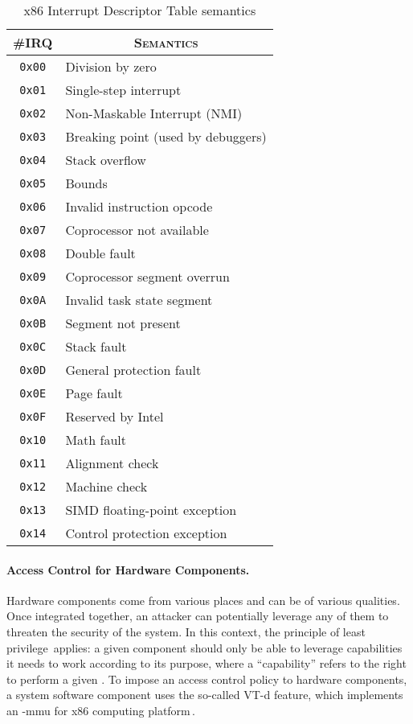\begin{table}
  \centering
  \begin{tabular}{cl}
    {\scshape \#IRQ}
    & \multicolumn{1}{c}{\scshape Semantics} \\
    \hline
    \texttt{0x00}
    & Division by zero \\
    \texttt{0x01}
    & Single-step interrupt \\
    \texttt{0x02}
    & Non-Maskable Interrupt (NMI) \\
    \texttt{0x03}
    & Breaking point (used by debuggers) \\
    \texttt{0x04}
    & Stack overflow \\
    \texttt{0x05}
    & Bounds \\
    \texttt{0x06}
    & Invalid instruction opcode \\
    \texttt{0x07}
    & Coprocessor not available \\
    \texttt{0x08}
    & Double fault \\
    \texttt{0x09}
    & Coprocessor segment overrun \\
    \texttt{0x0A}
    & Invalid task state segment \\
    \texttt{0x0B}
    & Segment not present \\
    \texttt{0x0C}
    & Stack fault \\
    \texttt{0x0D}
    & General protection fault \\
    \texttt{0x0E}
    & Page fault \\
    \texttt{0x0F}
    & Reserved by Intel \\
    \texttt{0x10}
    & Math fault \\
    \texttt{0x11}
    & Alignment check \\
    \texttt{0x12}
    & Machine check \\
    \texttt{0x13}
    & SIMD floating-point exception \\
    \texttt{0x14}
    & Control protection exception \\
  \end{tabular}
  \caption{x86 Interrupt Descriptor Table semantics}
  \label{tab:usecase:idt}
\end{table}

\paragraph{Access Control for Hardware Components.}
%
Hardware components come from various places and can be of various qualities.
%
Once integrated together, an attacker can potentially leverage any of them to
threaten the security of the system.
%
In this context, the principle of least
privilege\,\cite{saltzer1975leastprivilege} applies: a given component should
only be able to leverage capabilities it needs to work according to its purpose,
where a ``capability'' refers to the right to perform a given \IO.
%
To impose an access control policy to hardware components, a system software
component uses the so-called VT-d feature, which implements an \IO-\ac{mmu} for
x86 computing platform\,\cite{abramson2006vtd}.

